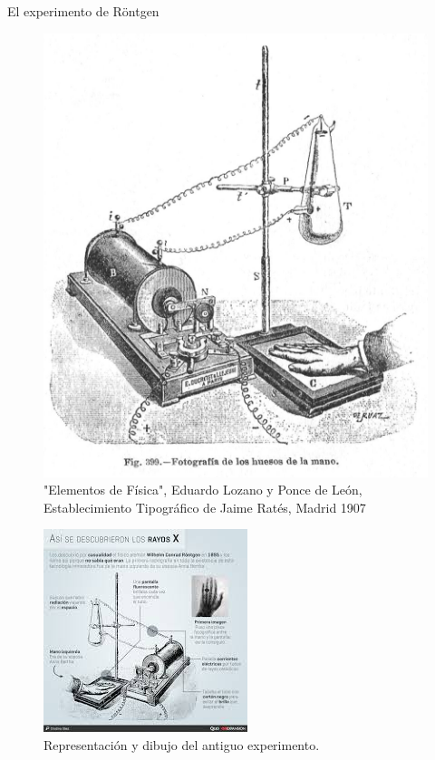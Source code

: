 \documentclass{beamer}
\begin{document}
\begin{darkframes}
\begin{frame}{El experimento de Röntgen}
     \begin{multicols}{2}
     \begin{figure}
         \centering
         \includegraphics[width = 0.75 \linewidth]{resources/20f.jpg}
         \caption{"Elementos de Física", Eduardo Lozano y Ponce de León, Establecimiento Tipográfico de Jaime Ratés, Madrid 1907}
         \label{fig:my_label}
     \end{figure}
     
     \newpage
     \begin{figure}
         \centering
         \includegraphics[width = 1 \linewidth]{resources/21f.jpeg}
         \caption{Representaci\'on y dibujo del antiguo experimento.}
         \label{fig:my_label}
     \end{figure}
     

\end{multicols}
\end{frame}
\end{darkframes}
\end{document}
